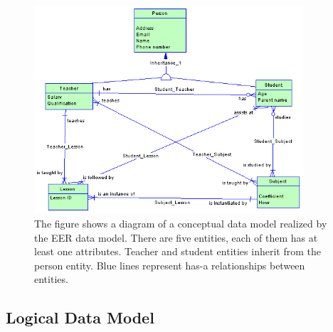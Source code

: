 \begin{figure}[H]
	\centering
	\includegraphics[width=10cm]{../img/Conceptual_Model_PowerDesigner}
	\caption[Conceptual diagram \cite{PowerDesignerDocumentation}]{The figure shows a diagram of a conceptual data model realized by the EER data model. There are five entities, each of them has at least one attributes. Teacher and student entities inherit from the person entity. Blue lines represent has-a relationships between entities.}
	\label{CDM}
\end{figure}

\subsection{Logical Data Model}

